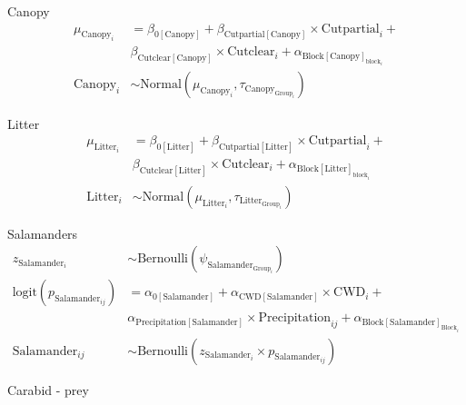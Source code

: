 Canopy \\

\begin{align}
  \mu_{\text{Canopy}_i} &= 
  \beta_{0[\text{Canopy}]} + \beta_{\text{Cutpartial}[\text{Canopy}]} \times \text{Cutpartial}_{i} + \nonumber \\
  & \beta_{\text{Cutclear}[\text{Canopy}]} \times \text{Cutclear}_{i} + \alpha_{\text{Block}[\text{Canopy}]_{\text{block}_i}} \\
  \text{Canopy}_{i} &\sim 
  \text{Normal} (\mu_{\text{Canopy}_i}, \tau_{\text{Canopy}_{\text{Group}_i}}) \nonumber 
\end{align}

Litter\\

\begin{align}
  \mu_{\text{Litter}_i} &= 
  \beta_{0[\text{Litter}]} + \beta_{\text{Cutpartial}[\text{Litter}]} \times \text{Cutpartial}_{i} + \nonumber\\
  & \beta_{\text{Cutclear}[\text{Litter}]} \times \text{Cutclear}_{i} + \alpha_{\text{Block}[\text{Litter}]_{\text{block}_i}} \\
  \text{Litter}_{i} &\sim 
  \text{Normal} (\mu_{\text{Litter}_i}, \tau_{\text{Litter}_{\text{Group}_i}}) \nonumber 
\end{align}

Salamanders \\

\begin{align}
z_{\text{Salamander}_i} &\sim 
\text{Bernoulli}(\psi_{\text{Salamander}_{\text{Group}_i}}) \nonumber \\
\text{logit}(p_{\text{Salamander}_{ij}}) &= 
\alpha_{0[\text{Salamander}]} + \alpha_{\text{CWD}[\text{Salamander}]} \times \text{CWD}_i + \\
&\alpha_{\text{Precipitation}[\text{Salamander}]} \times \text{Precipitation}_{ij} + \alpha_{\text{Block}[\text{Salamander}]_{\text{Block}_i}} \nonumber \\
\text{Salamander}_{ij} &\sim 
\text{Bernoulli}(z_{\text{Salamander}_i} \times p_{\text{Salamander}_{ij}}) \nonumber
\end{align}

Carabid - prey \\

